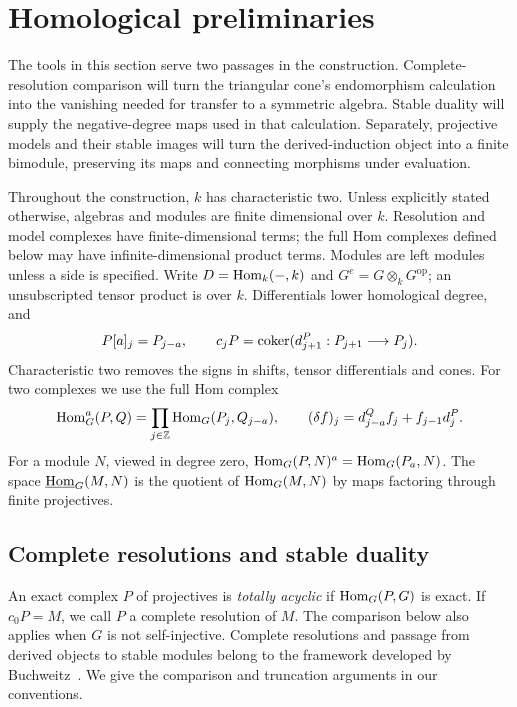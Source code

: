 \section{Homological preliminaries}\label{sec:homological}

The tools in this section serve two passages in the construction.
Complete-resolution comparison will turn the triangular cone's
endomorphism calculation into the vanishing needed for transfer to a
symmetric algebra. Stable duality will supply the negative-degree maps
used in that calculation. Separately, projective models and their stable
images will turn the derived-induction object into a finite bimodule,
preserving its maps and connecting morphisms under evaluation.

Throughout the construction, $k$ has characteristic two. Unless explicitly
stated otherwise, algebras and modules are finite dimensional over $k$.
Resolution and model complexes have finite-dimensional terms; the full Hom
complexes defined below may have infinite-dimensional product terms.
Modules are left modules unless a side is specified. Write
$D=\operatorname{Hom}_k(-,k)$ and $G^e=G\otimes_kG^{\mathrm{op}}$; an unsubscripted tensor
product is over $k$. Differentials lower homological degree, and
\[
 P[a]_j=P_{j-a},\qquad c_jP=\operatorname{coker}(d^P_{j+1}:P_{j+1}\longrightarrow P_j).
\]
Characteristic two removes the signs in shifts, tensor differentials and cones.
For two complexes we use the full Hom complex
\begin{equation}\label{h:full-hom}
 \operatorname{Hom}_G^a(P,Q)=\prod_{j\in\mathbb Z}\operatorname{Hom}_G(P_j,Q_{j-a}),\qquad
 (\delta f)_j=d^Q_{j-a}f_j+f_{j-1}d^P_j.
\end{equation}
For a module $N$, viewed in degree zero, $\operatorname{Hom}_G(P,N)^a=\operatorname{Hom}_G(P_a,N)$.
The space $\underline{\operatorname{Hom}}_G(M,N)$ is the quotient of $\operatorname{Hom}_G(M,N)$ by maps factoring
through finite projectives.

\subsection{Complete resolutions and stable duality}

An exact complex $P$ of projectives is \emph{totally acyclic} if
$\operatorname{Hom}_G(P,G)$ is exact. If $c_0P=M$, we call $P$ a complete resolution of $M$.
The comparison below also applies when $G$ is not self-injective.
Complete resolutions and passage from derived objects to stable modules
belong to the framework developed by Buchweitz~\cite{Buchweitz2021}.
We give the comparison and truncation arguments in our conventions.

